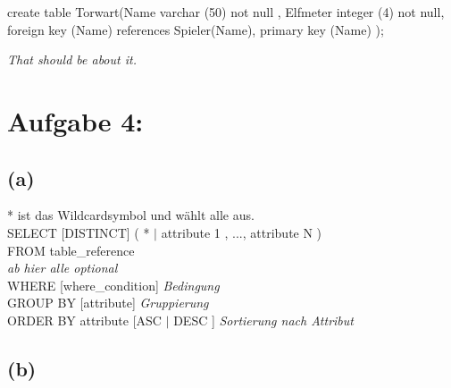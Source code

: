\documentclass[11pt]{article} %
\begin{document}
create table Torwart(Name varchar (50) not null , Elfmeter integer (4) not null, foreign key (Name) references Spieler(Name),  primary key (Name) );

\textit{That should be about it.}

\section*{\textbf{Aufgabe 4:}}
\subsection*{(a)}
* ist das Wildcardsymbol und wählt alle aus.\\
SELECT [DISTINCT] ( * $|$ attribute 1 , ..., attribute N )
\\
FROM table\_reference
\\
\textit{ab hier alle optional}\\
  WHERE [where\_condition]  \textit{\small Bedingung}
\\
GROUP BY [attribute] \textit{\small Gruppierung} \\ 
ORDER BY attribute [ASC $|$ DESC  ] \textit{\small Sortierung nach Attribut}\\
\subsection*{(b)}
\end{document}
